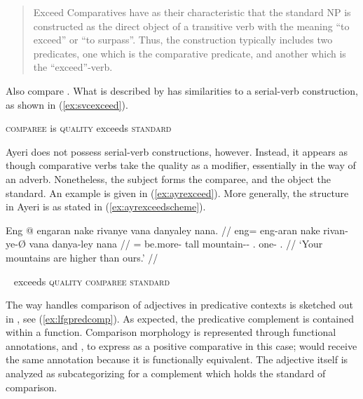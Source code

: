 \blockcquote{wals121}{Exceed Comparatives have as their characteristic that the
standard NP is constructed as the direct object of a transitive verb with the
meaning \enquote{to exceed} or \enquote{to surpass}. Thus, the construction
typically includes two predicates, one which is the comparative predicate, and
another which is the \enquote{exceed}-verb.}

Also compare \citet{beermannetal2005}. What is described by \citet{wals121} has
similarities to a serial-verb construction, as shown in (\ref{ex:svcexceed}).

\ex\label{ex:svcexceed}
	\textsc{comparee} is \textsc{quality} exceeds \textsc{standard}
\xe

Ayeri does not possess serial-verb constructions, however. Instead, it appears
as though comparative verbs take the quality as a modifier, essentially in the
way of an adverb. Nonetheless, the subject forms the comparee, and the object
the standard. An example is given in (\ref{ex:ayrexceed}). More generally, the
structure in Ayeri is as stated in (\ref{ex:ayrexceedscheme}).

\ex\label{ex:ayrexceed}\begingl
	\gla Eng @ engaran nake rivanye vana danyaley nana. //
	\glb eng= eng-aran nake rivan-ye-Ø vana danya-ley nana //
	\glc \AgtTI{}= be.more-\TplI{} tall mountain-\Pl{}-\Top{} \Second{}.\Gen{}
		one-\PargI{} \Fpl{}.\Gen{} //
	\glft `Your mountains are higher than ours.' //
\endgl
\xe

\ex~\label{ex:ayrexceedscheme}%
	exceeds \textsc{quality} \textsc{comparee} \textsc{standard}
\xe

The way \Lfg{} handles comparison of adjectives in predicative contexts is
sketched out in \citet[122]{butt1999}, see (\ref{ex:lfgpredcomp}). As expected,
the predicative complement is contained within a \Plink{} function. Comparison
morphology is represented through functional annotations, \Deg{} and \Degdim{},
to express  as a positive comparative in this case; 
would receive the same annotation because it is functionally equivalent. The
adjective itself is analyzed as subcategorizing for a complement which holds
the standard of comparison.

